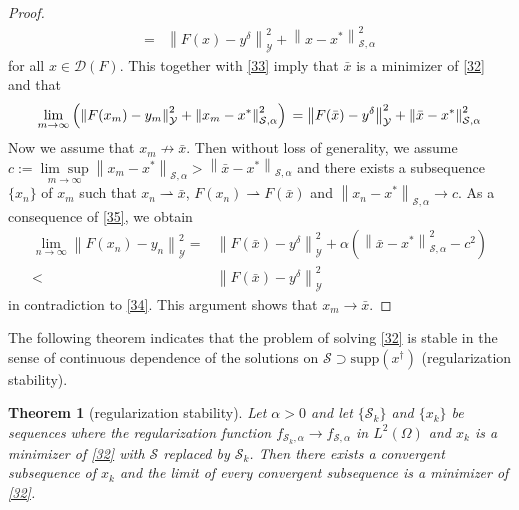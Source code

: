 \documentclass[11pt]{article}
\newtheorem{theorem}{Theorem}[section]
\begin{document}
\begin{proof}
\begin{displaymath}
\begin{aligned}
=
&\left\|F(x) - y^\delta\right\|^2_\mathcal{Y} + \left\|x - x^*\right\|_{\mathcal{S}, \alpha}^2
\end{aligned}
\end{displaymath}
for all $ x\in \mathcal{D}(F) $. This together with \eqref{33} imply that $\bar{x}$ is a minimizer of \eqref{32} and that
\begin{equation}\label{35}
\lim_{m\to\infty}\left(\left\|F(x_m) - y_m\right\|^2_\mathcal{Y} + \left\|x_m - x^*\right\|_{\mathcal{S}, \alpha}^2\right)\\
=
\left\|F(\bar{x}) - y^\delta\right\|^2_\mathcal{Y} + \left\|\bar{x} - x^*\right\|_{\mathcal{S}, \alpha}^2
\end{equation}
Now we assume that $ x_m\not\to\bar{x} $. Then without loss of generality, we assume $ c := \underset{m\to \infty}{\lim\sup}\left\|x_m - x^*\right\|_{\mathcal{S}, \alpha} > \left\|\bar{x} - x^*\right\|_{\mathcal{S}, \alpha} $ and there exists a subsequence $ \{x_n\} $ of $ x_m $ such that $ x_n\rightharpoonup \bar{x} $, $ F(x_n)\rightharpoonup F(\bar{x}) $ and $ \left\|x_n - x^*\right\|_{\mathcal{S}, \alpha}\to c $.
As a consequence of \eqref{35}, we obtain
\begin{equation*}
\begin{aligned}
\lim_{n\to\infty}\left\|F(x_n) - y_n\right\|^2_\mathcal{Y} =
&\left\|F(\bar{x}) - y^\delta\right\|^2_\mathcal{Y} + \alpha\left(\left\|\bar{x} - x^*\right\|_{\mathcal{S}, \alpha}^2 - c^2\right)\\
<&\left\|F(\bar{x}) - y^\delta\right\|^2_\mathcal{Y}
\end{aligned}
\end{equation*}
in contradiction to \eqref{34}. This argument shows that $ x_m\to \bar{x} $.
\end{proof}

The following theorem indicates that the problem of solving \eqref{32} is stable in the sense of continuous dependence of the solutions on $\mathcal{S}\supset \mathrm{supp}(x^\dagger)$ (regularization stability).

\begin{theorem}[regularization stability]\label{thm52}
Let $ \alpha>0 $ and let $ \{\mathcal{S}_k\} $ and $ \{x_k\} $ be sequences where the regularization function $ f_{\mathcal{S}_k,\alpha}\to f_{\mathcal{S},\alpha} $ in $ L^2(\Omega) $ and $ x_k $ is a minimizer of \eqref{32} with $ \mathcal{S} $ replaced by $ \mathcal{S}_k $. 
Then there exists a convergent subsequence of $ x_k $ and the limit of every convergent subsequence is a minimizer of \eqref{32}.
\end{theorem}
\end{document}
